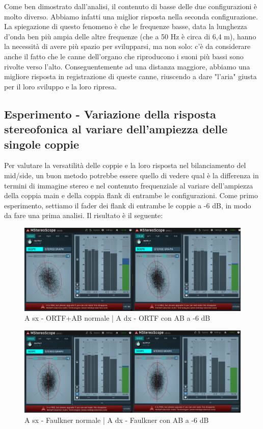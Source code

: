 \documentclass{article}
\begin{document}
    Come ben dimostrato dall'analisi, il contenuto di basse delle due configurazioni è molto diverso. Abbiamo infatti una miglior risposta nella seconda configurazione. La spiegazione di questo fenomeno è che le frequenze basse, data la lunghezza d'onda ben più ampia delle altre frequenze (che a 50 Hz è circa di 6,4 m), hanno la necessità di avere più spazio per svilupparsi, ma non solo: c'è da considerare anche il fatto che le canne dell'organo che riproducono i suoni più bassi sono rivolte verso l'alto. Conseguentemente ad una distanza maggiore, abbiamo una migliore risposta in registrazione di queste canne, riuscendo a dare "l'aria" giusta per il loro sviluppo e la loro ripresa.
\endsubsection 

\subsection{Esperimento - Variazione della risposta stereofonica al variare dell'ampiezza delle singole coppie}
    Per valutare la versatilità delle coppie e la loro risposta nel bilanciamento del mid/side, un buon metodo potrebbe essere quello di vedere qual è la differenza in termini di immagine stereo e nel contenuto frequenziale al variare dell'ampiezza della coppia main e della coppia flank di entrambe le configurazioni.
    Come primo esperimento, settiamo il fader dei flank di entrambe le coppie a -6 dB, in modo da fare una prima analisi. Il risultato è il seguente:
    
    \begin{figure}[H]
        \centering
        \includegraphics[width=1\textwidth]{images/3PLOT-6AB-STEREOSCOPE-FRONTEPALCO.png}
         \caption{\label{fig11}A sx - ORTF+AB normale | A dx - ORTF con AB a -6 dB}
    \end{figure}
    
    \begin{figure}[H]
        \centering
        \includegraphics[width=1\textwidth]{images/3PLOT-6AB-STEREOSCOPE-FAULKNER.png}
         \caption{\label{fig11}A sx - Faulkner normale | A dx - Faulkner con AB a -6 dB}
    \end{figure}
    
\end{document}
